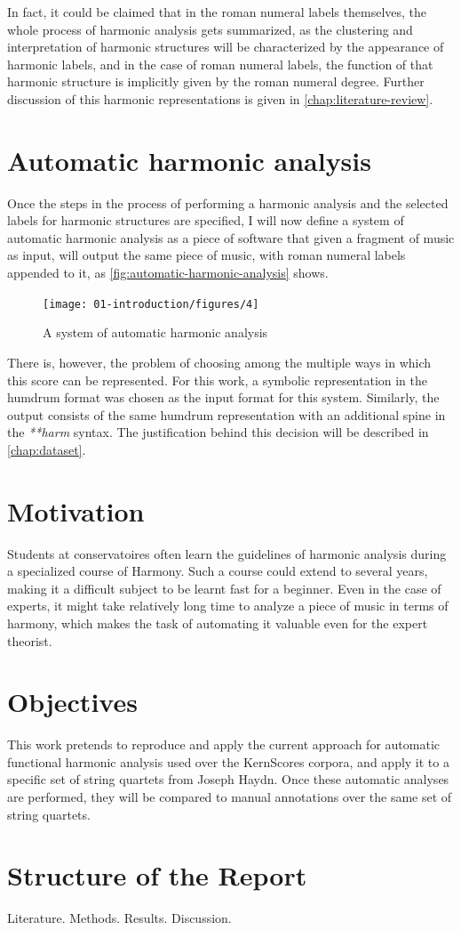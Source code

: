 In fact, it could be claimed that in the roman numeral labels themselves, the whole process of harmonic analysis gets summarized, as the clustering and interpretation of harmonic structures will be characterized by the appearance of harmonic labels, and in the case of roman numeral labels, the function of that harmonic structure is implicitly given by the roman numeral degree. Further discussion of this harmonic representations is given in  \autoref{chap:literature-review}.

\section{Automatic harmonic analysis}
Once the steps in the process of performing a harmonic analysis and the selected labels for harmonic structures are specified, I will now define a system of automatic harmonic analysis as a piece of software that given a fragment of music as input, will output the same piece of music, with roman numeral labels appended to it, as \autoref{fig:automatic-harmonic-analysis} shows.

\begin{figure}[h]
  \caption{A system of automatic harmonic analysis}
  \label{fig:automatic-harmonic-analysis}
  \centering
    \texttt{[image: 01-introduction/figures/4]}
\end{figure}

There is, however, the problem of choosing among the multiple ways in which this score can be represented. For this work, a symbolic representation in the humdrum format was chosen as the input format for this system. Similarly, the output consists of the same humdrum representation with an additional spine in the \emph{**harm} syntax. The justification behind this decision will be described in \autoref{chap:dataset}.

\section{Motivation}
Students at conservatoires often learn the guidelines of harmonic analysis during a specialized course of Harmony. Such a course could extend to several years, making it a difficult subject to be learnt fast for a beginner. Even in the case of experts, it might take relatively long time to analyze a piece of music in terms of harmony, which makes the task of automating it valuable even for the expert theorist.

\section{Objectives}
This work pretends to reproduce and apply the current approach for automatic functional harmonic analysis used over the KernScores corpora, and apply it to a specific set of string quartets from Joseph Haydn. Once these automatic analyses are performed, they will be compared to manual annotations over the same set of string quartets.

\section{Structure of the Report}
Literature. Methods. Results. Discussion.

\newpage
